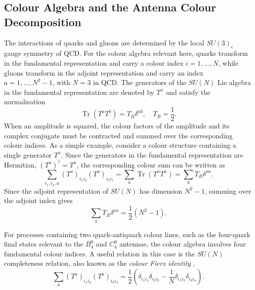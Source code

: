 \subsection{Colour Algebra and the Antenna Colour Decomposition}\label{subsec:colourAlg}

The interactions of quarks and gluons are determined by the local $SU(3)_c$
gauge symmetry of QCD. For the colour algebra relevant here, quarks transform
in the fundamental representation and carry a colour index $i=1,\ldots,N$,
while gluons transform in the adjoint representation and carry an index
$a=1,\ldots,N^2-1$, with $N=3$ in QCD. The generators of the $SU(N)$ Lie
algebra in the fundamental representation are denoted by $T^a$ and satisfy the
normalisation
\begin{equation}
    \operatorname{Tr}\left(T^aT^b\right)=T_R\delta^{ab},\quad T_R=\frac12.
\end{equation}
When an amplitude is squared, the colour factors of the amplitude and its
complex conjugate must be contracted and summed over the corresponding colour
indices. As a simple example, consider a colour structure containing a single
generator $T^a$. Since the generators in the fundamental representation are
Hermitian, $\left(T^a\right)^\dagger=T^a$, the corresponding colour sum can be
written as
\begin{equation}\label{eq:colourSum}
    \sum_{i_1,i_2,a}\left(T^a\right)_{i_1i_2}\left(T^a\right)_{i_2i_1}=\sum_a\operatorname{Tr}\left(T^aT^a\right)=\sum_aT_R\delta^{aa}.
\end{equation}
Since the adjoint representation of $SU(N)$ has dimension $N^2-1$, summing over
the adjoint index gives
\begin{equation}
    \sum_a T_R\delta^{aa}=\frac12\left(N^2-1\right).
\end{equation}

For processes containing two quark-antiquark colour lines, such as the
four-quark final states relevant to the $B_4^0$ and $C_4^0$ antennae, the
colour algebra involves four fundamental colour indices. A useful relation in
this case is the $SU(N)$ completeness relation, also known as the
\textit{colour Fierz identity} \cite{Ellis:1996mzs, Schwartz:2014sze},
\begin{equation}\label{eq:genTSum}
    \sum_a\left(T^a\right)_{i_1i_2}\left(T^a\right)_{i_3i_4}=\frac12\left(\delta_{i_1i_4}\delta_{i_2i_3}-\frac1N\delta_{i_1i_2}\delta_{i_3i_4}\right).
\end{equation}

